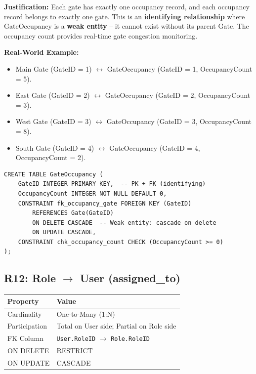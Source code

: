 \documentclass[a4paper, 12pt]{article}
\begin{document}
\textbf{Justification:} Each gate has exactly one occupancy record, and each occupancy record belongs to exactly one gate. This is an \textbf{identifying relationship} where GateOccupancy is a \textbf{weak entity} -- it cannot exist without its parent Gate. The occupancy count provides real-time gate congestion monitoring.

\textbf{Real-World Example:}
\begin{itemize}[leftmargin=*, nosep]
    \item Main Gate (GateID = 1) $\leftrightarrow$ GateOccupancy (GateID = 1, OccupancyCount = 5).
    \item East Gate (GateID = 2) $\leftrightarrow$ GateOccupancy (GateID = 2, OccupancyCount = 3).
    \item West Gate (GateID = 3) $\leftrightarrow$ GateOccupancy (GateID = 3, OccupancyCount = 8).
    \item South Gate (GateID = 4) $\leftrightarrow$ GateOccupancy (GateID = 4, OccupancyCount = 2).
\end{itemize}

\begin{lstlisting}[style=sqlstyle, caption={R11 Implementation}, label={lst:r11}]
CREATE TABLE GateOccupancy (
    GateID INTEGER PRIMARY KEY,  -- PK + FK (identifying)
    OccupancyCount INTEGER NOT NULL DEFAULT 0,
    CONSTRAINT fk_occupancy_gate FOREIGN KEY (GateID)
        REFERENCES Gate(GateID)
        ON DELETE CASCADE  -- Weak entity: cascade on delete
        ON UPDATE CASCADE,
    CONSTRAINT chk_occupancy_count CHECK (OccupancyCount >= 0)
);
\end{lstlisting}

\subsection{R12: Role \texorpdfstring{$\rightarrow$}{->} User (assigned\_to)}

\begin{table}[H]
\centering
\small
\begin{tabularx}{\textwidth}{l X}
\toprule
\textbf{Property} & \textbf{Value} \\
\midrule
Cardinality & One-to-Many (1:N) \\
Participation & Total on User side; Partial on Role side \\
FK Column & \texttt{User.RoleID} $\rightarrow$ \texttt{Role.RoleID} \\
ON DELETE & RESTRICT \\
ON UPDATE & CASCADE \\
\bottomrule
\end{tabularx}
\end{table}
\end{document}
